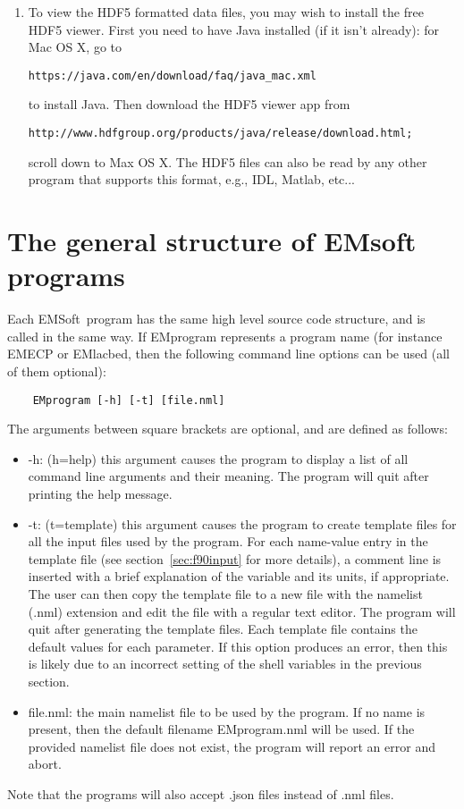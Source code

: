 \documentclass[DIV=calc, paper=letter, fontsize=11pt]{scrartcl}	 %
\newcommand{\ctp}{\textsf{EMSoft}}
\begin{document}
\begin{enumerate}
\item To view the HDF5 formatted data files, you may wish to install the free HDF5 viewer.  First you need to have Java installed (if it isn't already):
for Mac OS X, go to 
\begin{verbatim}
https://java.com/en/download/faq/java_mac.xml
\end{verbatim}
to install Java.  Then download the HDF5 viewer app from
\begin{verbatim}
http://www.hdfgroup.org/products/java/release/download.html;
\end{verbatim}
scroll down to Max OS X.
The HDF5 files can also be read by any other program that supports this format, e.g., IDL, Matlab, etc...
\end{enumerate}


\newpage
\section{The general structure of EMsoft programs\label{sec:structure}}
Each \ctp\ program has the same high level source code structure, and is called in the same way.  If \textsf{EMprogram} represents 
a program name (for instance \textsf{EMECP} or \textsf{EMlacbed}, then the following command line options can be used (all of them optional):
\begin{verbatim}
	EMprogram [-h] [-t] [file.nml]
\end{verbatim}
The arguments  between square brackets are optional, and are defined as follows:
\begin{itemize}
	\item \textsf{-h}: (h=help) this argument causes the program to display a list of all command line arguments and their meaning.  The program will quit after printing 
	the help message.
	\item \textsf{-t}: (t=template) this argument causes the program to create template files for all the input files used by the program.  For each
	name-value entry in the template file (see section~\ref{sec:f90input} for more details), a comment line is inserted with a brief explanation 
	of the variable and its units, if appropriate.  The user can then copy the template file to a new file with the namelist (.nml) extension and edit the 
	file with a regular text editor.  The program will quit after generating the template files.  Each template file contains the default values for each parameter.
	If this option produces an error, then this is likely due to an incorrect setting of the shell variables in the previous section.
	\item \textsf{file.nml}: the main namelist file to be used by the program.  If no name is present, then the default filename \textsf{EMprogram.nml} will be used.  If the 
	provided namelist file does not exist, the program will report an error and abort.
\end{itemize}
Note that the programs will also accept .json files instead of .nml files.
\end{document}
